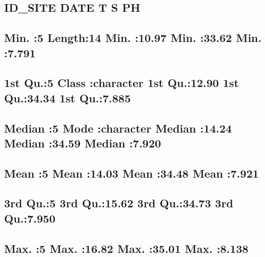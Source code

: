 \documentclass[
]{article}
\begin{document}
\hypertarget{id_site-date-t-s-ph}{%
\subsection{ID\_SITE DATE T S PH}\label{id_site-date-t-s-ph}}

\hypertarget{min.-5-length14-min.-10.97-min.-33.62-min.-7.791}{%
\subsection{Min. :5 Length:14 Min. :10.97 Min. :33.62 Min.
:7.791}\label{min.-5-length14-min.-10.97-min.-33.62-min.-7.791}}

\hypertarget{st-qu.5-class-character-1st-qu.12.90-1st-qu.34.34-1st-qu.7.885}{%
\subsection{1st Qu.:5 Class :character 1st Qu.:12.90 1st Qu.:34.34 1st
Qu.:7.885}\label{st-qu.5-class-character-1st-qu.12.90-1st-qu.34.34-1st-qu.7.885}}

\hypertarget{median-5-mode-character-median-14.24-median-34.59-median-7.920}{%
\subsection{Median :5 Mode :character Median :14.24 Median :34.59 Median
:7.920}\label{median-5-mode-character-median-14.24-median-34.59-median-7.920}}

\hypertarget{mean-5-mean-14.03-mean-34.48-mean-7.921}{%
\subsection{Mean :5 Mean :14.03 Mean :34.48 Mean
:7.921}\label{mean-5-mean-14.03-mean-34.48-mean-7.921}}

\hypertarget{rd-qu.5-3rd-qu.15.62-3rd-qu.34.73-3rd-qu.7.950}{%
\subsection{3rd Qu.:5 3rd Qu.:15.62 3rd Qu.:34.73 3rd
Qu.:7.950}\label{rd-qu.5-3rd-qu.15.62-3rd-qu.34.73-3rd-qu.7.950}}

\hypertarget{max.-5-max.-16.82-max.-35.01-max.-8.138}{%
\subsection{Max. :5 Max. :16.82 Max. :35.01 Max.
:8.138}\label{max.-5-max.-16.82-max.-35.01-max.-8.138}}
\end{document}
